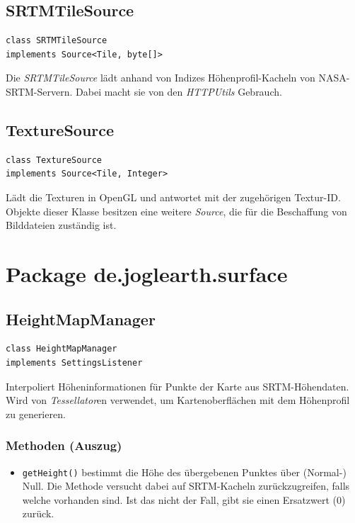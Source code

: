 \documentclass[10pt]{scrreprt}
\begin{document}
\vspace{5mm}
\subsection*{SRTMTileSource}
\begin{lstlisting}
class SRTMTileSource
implements Source<Tile, byte[]>
\end{lstlisting}
Die \textit{SRTMTileSource} lädt anhand von Indizes Höhenprofil-Kacheln von NASA-SRTM-Servern. Dabei macht sie von den \textit{HTTPUtils} Gebrauch.\\

\vspace{5mm}
\subsection*{TextureSource}
\begin{lstlisting}
class TextureSource
implements Source<Tile, Integer>
\end{lstlisting}
Lädt die Texturen in OpenGL und antwortet mit der zugehörigen Textur-ID. Objekte dieser Klasse besitzen eine weitere \textit{Source}, die für die Beschaffung von Bilddateien zuständig ist. \\



\vspace{5mm}
\section{Package de.joglearth.surface}
\subsection*{HeightMapManager}
\begin{lstlisting}
class HeightMapManager
implements SettingsListener
\end{lstlisting}
Interpoliert Höheninformationen für Punkte der Karte aus SRTM-Höhendaten. Wird von \textit{Tessellator}en verwendet, um Kartenoberflächen mit dem Höhenprofil zu generieren.\\
\subsubsection*{Methoden (Auszug)}
\begin{itemize}
\item\texttt{getHeight()} bestimmt die Höhe des übergebenen Punktes über (Normal-) Null. Die Methode versucht dabei auf SRTM-Kacheln zurückzugreifen, falls welche vorhanden sind. Ist das nicht der Fall, gibt sie einen Ersatzwert (0) zurück.
\end{itemize}
\end{document}
